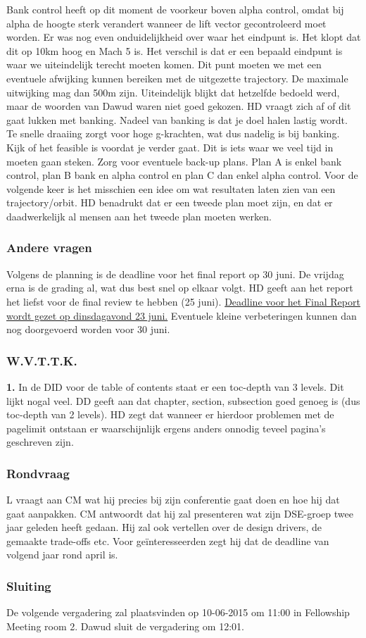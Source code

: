 Bank control heeft op dit moment de voorkeur boven alpha control, omdat bij alpha de hoogte sterk verandert wanneer de lift vector gecontroleerd moet worden. Er was nog even onduidelijkheid over waar het eindpunt is. Het klopt dat dit op 10km hoog en Mach 5 is. Het verschil is dat er een bepaald eindpunt is waar we uiteindelijk terecht moeten komen. Dit punt moeten we met een eventuele afwijking kunnen bereiken met de uitgezette trajectory. De maximale uitwijking mag dan 500m zijn. Uiteindelijk blijkt dat hetzelfde bedoeld werd, maar de woorden van Dawud waren niet goed gekozen. HD vraagt zich af of dit gaat lukken met banking. Nadeel van banking is dat je doel halen lastig wordt. Te snelle draaiing zorgt voor hoge g-krachten, wat dus nadelig is bij banking. Kijk of het feasible is voordat je verder gaat. Dit is iets waar we veel tijd in moeten gaan steken. Zorg voor eventuele back-up plans. Plan A is enkel bank control, plan B bank en alpha control en plan C dan enkel alpha control. Voor de volgende keer is het misschien een idee om wat resultaten laten zien van een trajectory/orbit. HD benadrukt dat er een tweede plan moet zijn, en dat er daadwerkelijk al mensen aan het tweede plan moeten werken.

\subsubsection{Andere vragen}
Volgens de planning is de deadline voor het final report op 30 juni. De vrijdag erna is de grading al, wat dus best snel op elkaar volgt. HD geeft aan het report het liefst voor de final review te hebben (25 juni). \underline{Deadline voor het Final Report wordt gezet op dinsdagavond 23 juni.} Eventuele kleine verbeteringen kunnen dan nog doorgevoerd worden voor 30 juni.

\subsubsection{W.V.T.T.K.}

\textbf{1.} In de DID voor de table of contents staat er een toc-depth van 3 levels. Dit lijkt nogal veel. DD geeft aan dat chapter, section, subsection goed genoeg is (dus toc-depth van 2 levels). HD zegt dat  wanneer er hierdoor problemen met de pagelimit ontstaan er waarschijnlijk ergens anders onnodig teveel pagina's geschreven zijn. 

\subsubsection{Rondvraag}
L vraagt aan CM wat hij precies bij zijn conferentie gaat doen en hoe hij dat gaat aanpakken. CM antwoordt dat hij zal presenteren wat zijn DSE-groep twee jaar geleden heeft gedaan. Hij zal ook vertellen over de design drivers, de gemaakte trade-offs etc. Voor ge\"{i}nteresseerden zegt hij dat de deadline van volgend jaar rond april is. 

\subsubsection{Sluiting}
De volgende vergadering zal plaatsvinden op 10-06-2015 om 11:00 in Fellowship Meeting room 2.
\newline\newline
Dawud sluit de vergadering om 12:01.